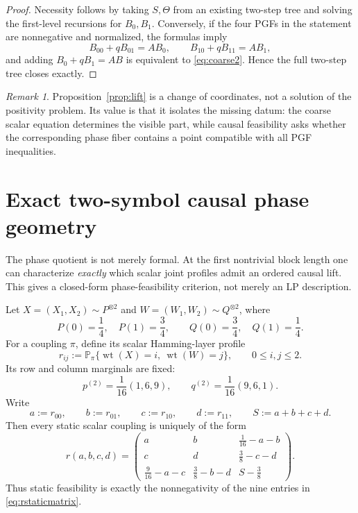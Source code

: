 \documentclass[11pt,a4paper]{article}
\theoremstyle{definition}
\theoremstyle{remark}
\newtheorem{remark}[theorem]{Remark}
\newcommand{\Pp}{\mathbb P}
\newcommand{\wt}{\operatorname{wt}}
\begin{document}
\begin{proof}
Necessity follows by taking \(S,\Theta\) from an existing two-step tree and
solving the first-level recursions for \(B_0,B_1\).  Conversely, if the four
PGFs in the statement are nonnegative and normalized, the formulas imply
\[
 B_{00}+qB_{01}=AB_0,
 \qquad
 B_{10}+qB_{11}=AB_1,
\]
and adding \(B_0+qB_1=AB\) is equivalent to \eqref{eq:coarse2}.  Hence the
full two-step tree closes exactly.
\end{proof}

\begin{remark}
Proposition~\ref{prop:lift} is a change of coordinates, not a solution of the
positivity problem.  Its value is that it isolates the missing datum: the
coarse scalar equation determines the visible part, while causal feasibility
asks whether the corresponding phase fiber contains a point compatible with
all PGF inequalities.
\end{remark}

\section{Exact two-symbol causal phase geometry}
\label{sec:5over16}

The phase quotient is not merely formal.  At the first nontrivial block length
one can characterize \emph{exactly} which scalar joint profiles admit an
ordered causal lift.  This gives a closed-form phase-feasibility criterion,
not merely an LP description.

Let \(X=(X_1,X_2)\sim P^{\otimes2}\) and
\(W=(W_1,W_2)\sim Q^{\otimes2}\), where
\[
 P(0)=\frac14,\quad P(1)=\frac34,
 \qquad
 Q(0)=\frac34,\quad Q(1)=\frac14.
\]
For a coupling \(\pi\), define its scalar Hamming-layer profile
\begin{equation}
 r_{ij}:=\Pp_\pi\{\wt(X)=i,\ \wt(W)=j\},
 \qquad 0\le i,j\le2.
 \label{eq:rprofile}
\end{equation}
Its row and column marginals are fixed:
\[
 p^{(2)}=\frac1{16}(1,6,9),
 \qquad
 q^{(2)}=\frac1{16}(9,6,1).
\]
Write
\begin{equation}
 a:=r_{00},\qquad b:=r_{01},\qquad c:=r_{10},\qquad d:=r_{11},
 \qquad S:=a+b+c+d.
 \label{eq:abcd}
\end{equation}
Then every static scalar coupling is uniquely of the form
\begin{equation}
 \boxed{
 r(a,b,c,d)=
 \begin{pmatrix}
 a & b & \frac1{16}-a-b\\[1mm]
 c & d & \frac38-c-d\\[1mm]
 \frac9{16}-a-c & \frac38-b-d & S-\frac38
 \end{pmatrix}.}
 \label{eq:rstaticmatrix}
\end{equation}
Thus static feasibility is exactly the nonnegativity of the nine entries in
\eqref{eq:rstaticmatrix}.
\end{document}
